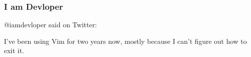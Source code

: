 \begin{frame}[fragile]
  \frametitle{I am Devloper}
  @iamdevloper said on Twitter:
  \vspace{1cm}
  \begin{displayquote}
    I've been using Vim for two years now, mostly because I can't figure out how
    to exit it.
  \end{displayquote}
\end{frame}
